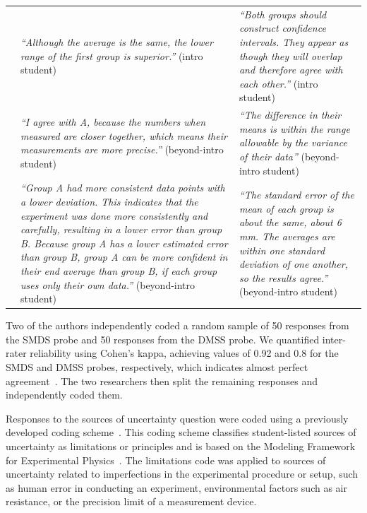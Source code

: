\documentclass[english,aps,prstper,reprint,showpacs,longbibliography,superscriptaddress,nofootinbib]{revtex4-2}
\begin{document}
\begin{table}[tb]
\begin{ruledtabular}
\begin{tabular}{p{}p{}p{}}
    &\textit{``Although the average is the same, the lower range of the first group is superior.''} (intro student) &  \textit{``Both groups should construct confidence intervals. They appear as though they will overlap and therefore agree with each other.''} (intro student)\\
    & \textit{``I agree with A, because the numbers when measured are closer together, which means their measurements are more precise.''} (beyond-intro student) & \textit{``The difference in their means is within the range allowable by the variance of their data''} (beyond-intro student)\\
    & \textit{``Group A had more consistent data points with a lower deviation. This indicates that the experiment was done more consistently and carefully, resulting in a lower error than group B.
Because group A has a lower estimated error than group B, group A can be more confident in their end average than group B, if each group uses only their own data.''} (beyond-intro student)& \textit{``The standard error of the mean of each group is about the same, about 6 mm. The averages are within one standard deviation of one another, so the results agree.''} (beyond-intro student) \\
    \end{tabular}
  \end{ruledtabular}
\end{table}

Two of the authors independently coded a random sample of 50 responses from the SMDS probe and 50 responses from the DMSS probe. We quantified inter-rater reliability using Cohen's kappa, achieving values of 0.92 and 0.8 for the SMDS and DMSS probes, respectively, which indicates almost perfect agreement~\cite{Landis1977}. The two researchers then split the remaining responses and independently coded them.

Responses to the sources of uncertainty question were coded using a previously developed coding scheme~\cite{StumpTBD}. This coding scheme classifies student-listed sources of uncertainty as limitations or principles and is based on the Modeling Framework for Experimental Physics~\cite{Zwickl2015,DounasFrazer2018}. The limitations code was applied to sources of uncertainty related to imperfections in the experimental procedure or setup, such as human error in conducting an experiment, environmental factors such as air resistance, or the precision limit of a measurement device.
\end{document}
